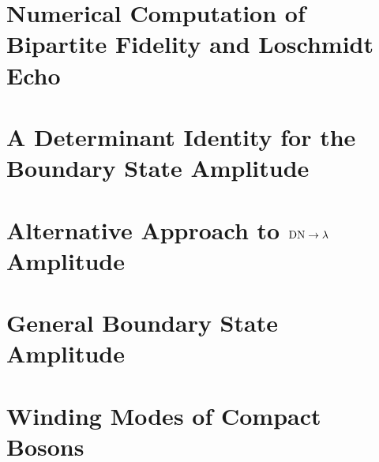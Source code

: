 \documentclass[preprint, prb]{revtex4-1}
\begin{document}
\section{Numerical Computation of Bipartite Fidelity and Loschmidt Echo}
\label{app:comp_fid_echo}


\section{A Determinant Identity for the Boundary State Amplitude}
\label{app:pf_of_id}


\section{Alternative Approach to ${\rm DN} \rightarrow \lambda$ Amplitude}
\label{app:gnd_dn_lambda}


\section{General Boundary State Amplitude}
\label{app:lambda_12}


\section{Winding Modes of Compact Bosons}
\label{app:compact_diff_boson}





\end{document}

